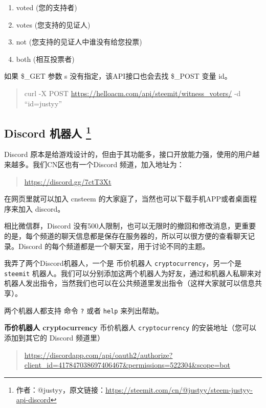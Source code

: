 \documentclass[]{ctexbook}
\providecommand{\tightlist}{%
  \setlength{\itemsep}{0pt}\setlength{\parskip}{0pt}}
\begin{document}
\begin{enumerate}
\def\labelenumi{\arabic{enumi}.}
\tightlist
\item
  voted (您的支持者)
\item
  votes (您支持的见证人)
\item
  not (您支持的见证人中谁没有给您投票)
\item
  both (相互投票者)
\end{enumerate}

如果 \$\_GET 参数 s 没有指定，该API接口也会去找 \$\_POST 变量 id。

\begin{quote}
curl -X POST \url{https://helloacm.com/api/steemit/witness_voters/} -d ``id=justyy''
\end{quote}

\hypertarget{discord-}{%
\subsection[Discord 机器人 ]{\texorpdfstring{Discord 机器人 \footnote{作者：@justyy，原文链接：\url{https://steemit.com/cn/@justyy/steem-justyy-api-discord}}}{Discord 机器人 }}\label{discord-}}

Discord 原本是给游戏设计的，但由于其功能多，接口开放能力强，使用的用户越来越多。我们CN区也有一个Discord 频道，加入地址为：

\begin{quote}
\url{https://discord.gg/7ctT3Xt}
\end{quote}

在网页里就可以加入 cnsteem 的大家庭了，当然也可以下载手机APP或者桌面程序来加入 discord。

相比微信群，Discord 没有500人限制，也可以无限时的撤回和修改消息，更重要的是，每个频道的聊天信息都是保存在服务器的，所以可以很方便的查看聊天记录。Discord 的每个频道都是一个聊天室，用于讨论不同的主题。

我弄了两个Discord机器人，一个是 币价机器人 \texttt{cryptocurrency}，另一个是 \texttt{steemit} 机器人。我们可以分别添加这两个机器人为好友，通过和机器人私聊来对机器人发出指令，当然我们也可以在公共频道里发出指令（这样大家就可以信息共享）。

两个机器人都支持 命令 \texttt{?} 或者 \texttt{help} 来列出帮助。

\textbf{币价机器人 cryptocurrency}
币价机器人 \texttt{cryptocurrency} 的安装地址（您可以添加到其它的 Discord 频道里）

\begin{quote}
\url{https://discordapp.com/api/oauth2/authorize?client_id=417847038697406467\&permissions=522304\&scope=bot}
\end{quote}
\end{document}
